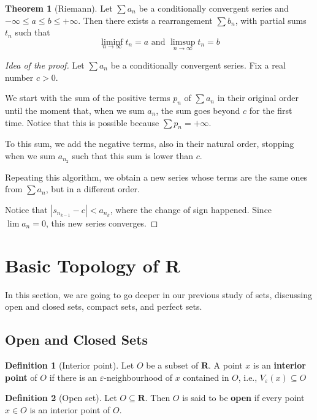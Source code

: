 \documentclass[tikz,12pt,a4paper]{article}
\theoremstyle{definition}
\newtheorem{theorem}{Theorem}[section]
\newtheorem{definition}{Definition}[section]
\begin{document}
\begin{theorem}[Riemann]
	Let $\sum a_n$ be a conditionally convergent series and $- \infty \leq a \leq b \leq + \infty$. Then there exists a rearrangement $\sum b_n$, with partial sums $t_n$ such that
	\[
		\liminf_{n \to \infty} t_n = a \text{ and } \limsup_{n \to \infty} t_n = b
	\]
\end{theorem}

\begin{proof}[Idea of the proof]
	Let $\sum a_n$ be a conditionally convergent series. Fix a real number $c > 0$.
	
	We start with the sum of the positive terms $p_n$ of $\sum a_n$ in their original order until the moment that, when we sum $a_n$, the sum goes beyond $c$ for the first time. Notice that this is possible because $\sum p_n = + \infty$.
	
	To this sum, we add the negative terms, also in their natural order, stopping when we sum $a_{n_2}$ such that this sum is lower than $c$.
	
	Repeating this algorithm, we obtain a new series whose terms are the same ones from $\sum a_n$, but in a different order.
	
	Notice that $|s_{n_{k-1}} - c| < a_{n_k}$, where the change of sign happened. Since $\lim a_n = 0$, this new series converges.
\end{proof}

\newpage
\section{Basic Topology of \textbf{R}}

In this section, we are going to go deeper in our previous study of sets, discussing open and closed sets, compact sets, and perfect sets.

\subsection{Open and Closed Sets}

\begin{definition}[Interior point]
	Let $O$ be a subset of $\textbf{R}$. A point $x$ is an \textbf{interior point} of $O$ if there is an $\varepsilon$-neighbourhood of $x$ contained in $O$, i.e., $V_{\varepsilon}(x) \subseteq O$ 
\end{definition}

\begin{definition}[Open set]
	Let $O \subseteq \textbf{R}$. Then $O$ is said to be \textbf{open} if every point $x \in O$ is an interior point of $O$.
\end{definition}
\end{document}
